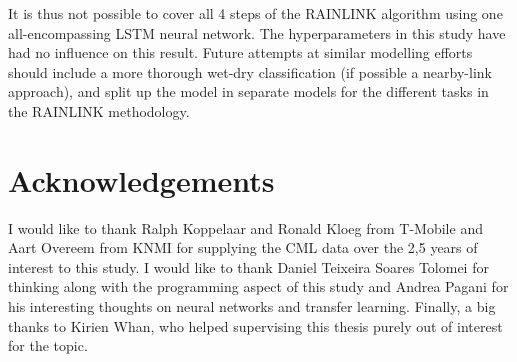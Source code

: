 \documentclass[twocolumn, 10pt, a4paper]{memoir}
\begin{document}
	It is thus not possible to cover all 4 steps of the RAINLINK algorithm using one all-encompassing LSTM neural network. The hyperparameters in this study have had no influence on this result. Future attempts at similar modelling efforts should include a more thorough wet-dry classification (if possible a nearby-link approach), and split up the model in separate models for the different tasks in the RAINLINK methodology.  
	
	


	\chapter*{Acknowledgements}\vspace{-6mm}       %
	 {}
	I would like to thank Ralph Koppelaar and Ronald Kloeg from T-Mobile and Aart Overeem from KNMI for supplying the CML data over the 2,5 years of interest to this study. I would like to thank Daniel Teixeira Soares Tolomei for thinking along with the programming aspect of this study and Andrea Pagani for his interesting thoughts on neural networks and transfer learning. Finally, a big thanks to Kirien Whan, who helped supervising this thesis purely out of interest for the topic.

	
	
	
	
	
	
	
	
	
	
	
\end{document}
